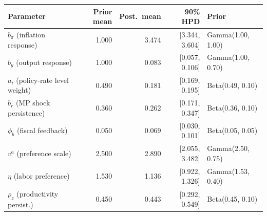 \documentclass[]{article}
\begin{document}
\begin{table}[h]
\centering
\small
\begin{tabular}{lrrrl}
\toprule
Parameter & Prior mean & Post.\ mean & 90\% HPD & Prior \\
\midrule

$b_\pi$ (inflation response)    & 1.000 & 3.474 & [3.344, 3.604] & Gamma(1.00, 1.00) \\
$b_y$ (output response)         & 1.000 & 0.083 & [0.057, 0.106] & Gamma(1.00, 0.70) \\
$a_i$ (policy-rate level weight)& 0.490 & 0.181 & [0.169, 0.195] & Beta(0.49, 0.10) \\
$b_r$ (MP shock persistence)    & 0.360 & 0.262 & [0.171, 0.347] & Beta(0.36, 0.10) \\
$\phi_b$ (fiscal feedback)   & 0.050 & 0.069 & [0.030, 0.101] & Beta(0.05, 0.05) \\
$v^a$ (preference scale)        & 2.500 & 2.890 & [2.055, 3.482] & Gamma(2.50, 0.75) \\
$\eta$ (labor preference)       & 1.530 & 1.136 & [0.922, 1.326] & Gamma(1.53, 0.40) \\
$\rho_z$ (productivity persist.)& 0.450 & 0.443 & [0.292, 0.549] & Beta(0.45, 0.10) \\


\end{tabular}
\end{table}
\end{document}
